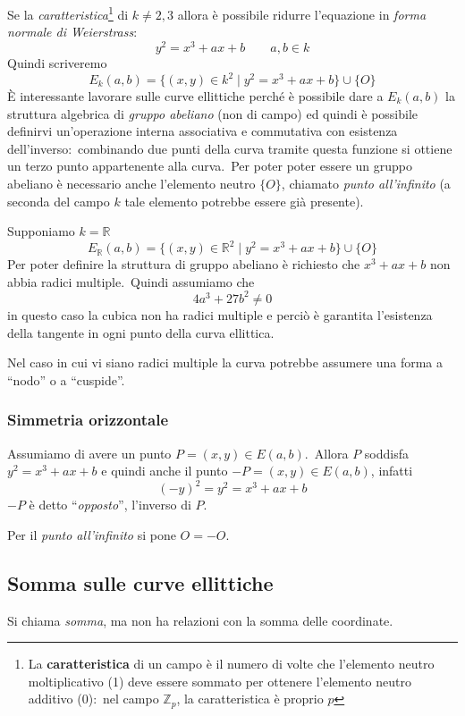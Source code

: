 \noindent Se la \textit{caratteristica}\footnote{La \textbf{caratteristica} di un campo è il numero di volte che l'elemento neutro moltiplicativo (1) deve essere sommato per ottenere l'elemento neutro additivo (0):\ nel campo $\mathbb{Z}_p$, la caratteristica è proprio $p$} di $k \neq 2,3$ allora è possibile ridurre l'equazione in \textit{forma normale di Weierstrass}:
\[y^2 =  x^3 + ax + b \qquad a,b \in k\]
Quindi scriveremo
\[E_k(a,b) = \{(x,y) \in k^2 \mid y^2 = x^3 + ax + b\} \cup \{O\}\]
È interessante lavorare sulle curve ellittiche perché è possibile dare a $E_k(a,b)$ la struttura algebrica di \textit{gruppo abeliano} (non di campo) ed quindi è possibile definirvi un'operazione interna associativa e commutativa con esistenza dell'inverso:\ combinando due punti della curva tramite questa funzione si ottiene un terzo punto appartenente alla curva.\
Per poter poter essere un gruppo abeliano è necessario anche l'elemento neutro $\{O\}$, chiamato \textit{punto all'infinito} (a seconda del campo $k$ tale elemento potrebbe essere già presente).\

Supponiamo $k=\mathbb{R}$
\[E_{\mathbb{R}}(a,b) = \{(x,y) \in \mathbb{R}^2 \mid y^2 = x^3 + ax + b\} \cup \{O\}\]
Per poter definire la struttura di gruppo abeliano è richiesto che $x^3 + ax + b$ non abbia radici multiple.\
Quindi assumiamo che \[4a^3 +27b^2 \neq 0\]
in questo caso la cubica non ha radici multiple e perciò è garantita l'esistenza della tangente in ogni punto della curva ellittica.\

Nel caso in cui vi siano radici multiple la curva potrebbe assumere una forma a ``nodo'' o a ``cuspide''.\

\subsubsection{Simmetria orizzontale}

Assumiamo di avere un punto $P = (x,y) \in E(a,b)$.\
Allora $P$ soddisfa $y^2 = x^3 + ax + b$ e quindi anche il punto $-P = (x,y) \in E(a,b)$, infatti
\[\left(-y \right)^2 = y^2 = x^3 + ax + b\]
$-P$ è detto ``\textit{opposto}'', l'inverso di $P$.\

Per il \textit{punto all'infinito} si pone $O = -O$.\

\subsection{Somma sulle curve ellittiche}

Si chiama \textit{somma}, ma non ha relazioni con la somma delle coordinate.\

